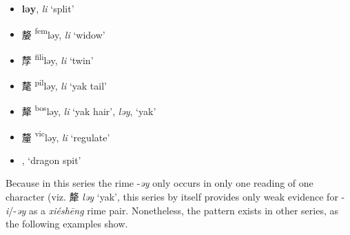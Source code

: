 \begin{itemize}
    \item {\Large{}} %
    {\large{\textbf{ləy}}},
    \textit{li} `split'            %

    \item {\Large{嫠}} %
    {\large{{\textsuperscript{fem}}ləy}},
    \textit{li} `widow'            %

    \item {\Large{孷}} %
    {\large{{\textsuperscript{fili}}ləy}},
    \textit{li} `twin'            %

    \item {\Large{氂}} %
    {\large{{\textsuperscript{pil}}ləy}},
    \textit{li} `yak tail'            %

    \item {\Large{犛}} %
    {\large{{\textsuperscript{bos}}ləy}},
    \textit{li} `yak hair', \textit{ləy}, 
    \textit{\color{gray}{maew}}  `yak'     %

   
    \item {\Large{釐}} %
    {\large{{\textsuperscript{vic}}ləy}},
    \textit{li} `regulate'            %

\item {} %
{},
{ `dragon spit'}           %
\end{itemize}

Because in this series the rime -\textit{əy} only occurs in only one reading of one character (viz. 犛 \textit{ləy} `yak', this series by itself provides only weak evidence for -\textit{i}/-\textit{əy} as a \textit{xiéshēng} rime pair. Nonetheless, the pattern exists in other series, as the following examples show. 

